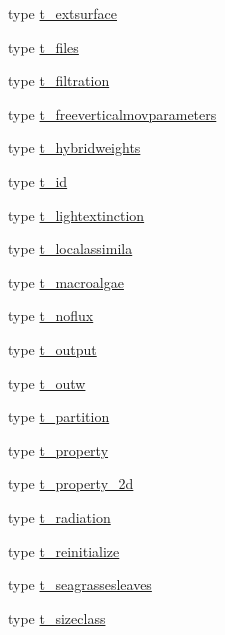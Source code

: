 \begin{DoxyCompactItemize}
\item 
type \mbox{\hyperlink{structmodulewaterproperties_1_1t__extsurface}{t\+\_\+extsurface}}
\item 
type \mbox{\hyperlink{structmodulewaterproperties_1_1t__files}{t\+\_\+files}}
\item 
type \mbox{\hyperlink{structmodulewaterproperties_1_1t__filtration}{t\+\_\+filtration}}
\item 
type \mbox{\hyperlink{structmodulewaterproperties_1_1t__freeverticalmovparameters}{t\+\_\+freeverticalmovparameters}}
\item 
type \mbox{\hyperlink{structmodulewaterproperties_1_1t__hybridweights}{t\+\_\+hybridweights}}
\item 
type \mbox{\hyperlink{structmodulewaterproperties_1_1t__id}{t\+\_\+id}}
\item 
type \mbox{\hyperlink{structmodulewaterproperties_1_1t__lightextinction}{t\+\_\+lightextinction}}
\item 
type \mbox{\hyperlink{structmodulewaterproperties_1_1t__localassimila}{t\+\_\+localassimila}}
\item 
type \mbox{\hyperlink{structmodulewaterproperties_1_1t__macroalgae}{t\+\_\+macroalgae}}
\item 
type \mbox{\hyperlink{structmodulewaterproperties_1_1t__noflux}{t\+\_\+noflux}}
\item 
type \mbox{\hyperlink{structmodulewaterproperties_1_1t__output}{t\+\_\+output}}
\item 
type \mbox{\hyperlink{structmodulewaterproperties_1_1t__outw}{t\+\_\+outw}}
\item 
type \mbox{\hyperlink{structmodulewaterproperties_1_1t__partition}{t\+\_\+partition}}
\item 
type \mbox{\hyperlink{structmodulewaterproperties_1_1t__property}{t\+\_\+property}}
\item 
type \mbox{\hyperlink{structmodulewaterproperties_1_1t__property__2d}{t\+\_\+property\+\_\+2d}}
\item 
type \mbox{\hyperlink{structmodulewaterproperties_1_1t__radiation}{t\+\_\+radiation}}
\item 
type \mbox{\hyperlink{structmodulewaterproperties_1_1t__reinitialize}{t\+\_\+reinitialize}}
\item 
type \mbox{\hyperlink{structmodulewaterproperties_1_1t__seagrassesleaves}{t\+\_\+seagrassesleaves}}
\item 
type \mbox{\hyperlink{structmodulewaterproperties_1_1t__sizeclass}{t\+\_\+sizeclass}}
\item 

\end{DoxyCompactItemize}

